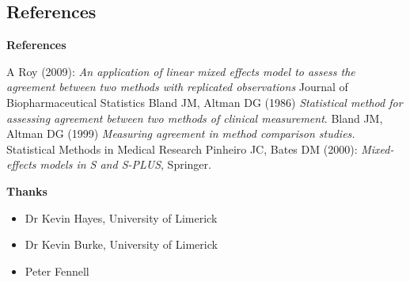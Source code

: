 \documentclass[compress]{beamer}        %
\makeatletter
\newcommand{\tcb}{\textcolor{beamer@blendedblue}}
\makeatother
\begin{document}
		\subsection{References}
		\begin{frame}{\bf \tcb{References}}
			\begin{thebibliography}{99}
				 A Roy (2009): \emph{An application of linear mixed effects model to assess the agreement between two methods with replicated observations} Journal of Biopharmaceutical Statistics
				 Bland JM, Altman DG (1986) \emph{Statistical method for assessing agreement between two methods of clinical measurement}.
				 Bland JM, Altman DG (1999)  \emph{Measuring agreement in method comparison studies.} Statistical Methods in Medical Research
				 Pinheiro JC, Bates DM (2000): \emph{Mixed-effects models in S and S-PLUS},
				Springer.
			\end{thebibliography}
		\end{frame}
		
		
		\begin{frame}{\bf \tcb{Thanks}}
			\begin{itemize}
				\item Dr Kevin Hayes, University of Limerick
				\item Dr Kevin Burke, University of Limerick
				\item Peter Fennell
			\end{itemize}
		\end{frame}
		
		
	
\end{document}
